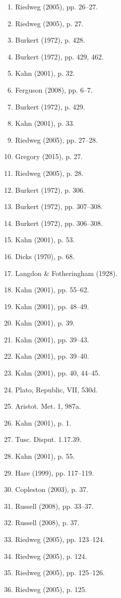 \begin{enumerate}
\item Riedweg (2005), pp. 26–27.  
\item Riedweg (2005), p. 27.  
\item Burkert (1972), p. 428.  
\item Burkert (1972), pp. 429, 462.  
\item Kahn (2001), p. 32.  
\item Ferguson (2008), pp. 6–7.
\item Burkert (1972), p. 429.  
\item Kahn (2001), p. 33.  
\item Riedweg (2005), pp. 27–28.  
\item Gregory (2015), p. 27.  
\item Riedweg (2005), p. 28.  
\item Burkert (1972), p. 306.  
\item Burkert (1972), pp. 307–308.  
\item Burkert (1972), pp. 306–308.  
\item Kahn (2001), p. 53.  
\item Dicks (1970), p. 68.  
\item Langdon & Fotheringham (1928).  
\item Kahn (2001), pp. 55–62.  
\item Kahn (2001), pp. 48–49.  
\item Kahn (2001), p. 39.  
\item Kahn (2001), pp. 39–43.  
\item Kahn (2001), pp. 39–40.  
\item Kahn (2001), pp. 40, 44–45.  
\item Plato, Republic, VII, 530d.  
\item Aristot. Met. 1, 987a.  
\item Kahn (2001), p. 1.  
\item Tusc. Disput. 1.17.39.  
\item Kahn (2001), p. 55.  
\item Hare (1999), pp. 117–119.  
\item Copleston (2003), p. 37.
\item Russell (2008), pp. 33–37.  
\item Russell (2008), p. 37.  
\item Riedweg (2005), pp. 123–124.  
\item Riedweg (2005), p. 124.  
\item Riedweg (2005), pp. 125–126.  
\item Riedweg (2005), p. 125.  

\end{enumerate}

